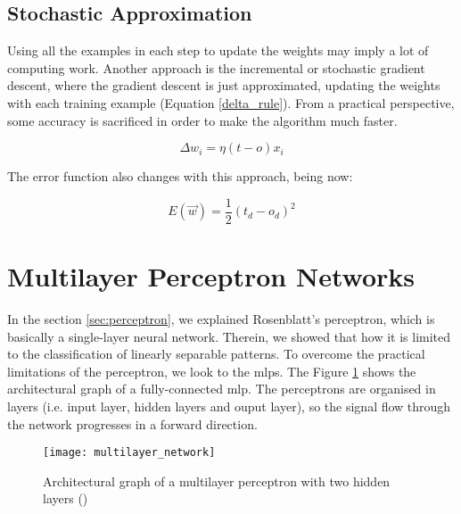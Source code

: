 	\subsection{Stochastic Approximation}
	Using all the examples in each step to update the weights may imply a lot of computing work. Another approach is the incremental or stochastic gradient descent, where the gradient descent is just approximated, updating the weights with each training example (Equation \ref{delta_rule}). From a practical perspective, some accuracy is sacrificed in order to make the algorithm much faster.

	\begin{equation}
		\label{delta_rule}
		\Delta w_{i}= \eta (t - o) x_{i}
	\end{equation}

	The error function also changes with this approach, being now:

	\begin{equation}
		\label{error_function_stoc_square}
		E(\vec{w}) = \frac{1}{2} (t_d-o_d)^2 
	\end{equation}


                           

\section{Multilayer Perceptron Networks}
In the section \ref{sec:perceptron}, we explained Rosenblatt’s perceptron, which is basically a single-layer neural network. Therein, we showed that how it is limited to the classification of linearly separable patterns. To overcome the practical limitations of the perceptron, we look to the \glspl{mlp}. The Figure \ref{fig:mlp_architectural_graph} shows the architectural graph of a fully-connected \gls{mlp}. The perceptrons are organised in layers (i.e. input layer, hidden layers and ouput layer), so the signal flow through the network progresses in a forward direction.

\begin{figure}[!ht]
	\centering
	\texttt{[image: multilayer\_network]}
	\caption{Architectural graph of a multilayer perceptron with two hidden layers (\cite{haykin2009neural})}
	\label{fig:mlp_architectural_graph}
\end{figure}


